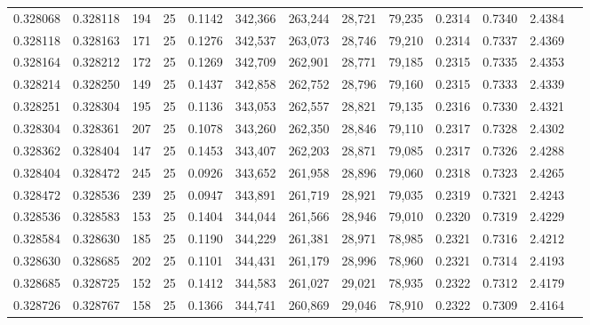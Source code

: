 \begin{tabular}{rrrrrrrrrrrrr}
0.328068 & 0.328118 &   194 &  25 &                                     0.1142 & 342,366 & 263,244 &  28,721 &  79,235 & 0.2314 & 0.7340 & 2.4384 \\
0.328118 & 0.328163 &   171 &  25 &                                     0.1276 & 342,537 & 263,073 &  28,746 &  79,210 & 0.2314 & 0.7337 & 2.4369 \\
0.328164 & 0.328212 &   172 &  25 &                                     0.1269 & 342,709 & 262,901 &  28,771 &  79,185 & 0.2315 & 0.7335 & 2.4353 \\
0.328214 & 0.328250 &   149 &  25 &                                     0.1437 & 342,858 & 262,752 &  28,796 &  79,160 & 0.2315 & 0.7333 & 2.4339 \\
0.328251 & 0.328304 &   195 &  25 &                                     0.1136 & 343,053 & 262,557 &  28,821 &  79,135 & 0.2316 & 0.7330 & 2.4321 \\
0.328304 & 0.328361 &   207 &  25 &                                     0.1078 & 343,260 & 262,350 &  28,846 &  79,110 & 0.2317 & 0.7328 & 2.4302 \\
0.328362 & 0.328404 &   147 &  25 &                                     0.1453 & 343,407 & 262,203 &  28,871 &  79,085 & 0.2317 & 0.7326 & 2.4288 \\
0.328404 & 0.328472 &   245 &  25 &                                     0.0926 & 343,652 & 261,958 &  28,896 &  79,060 & 0.2318 & 0.7323 & 2.4265 \\
0.328472 & 0.328536 &   239 &  25 &                                     0.0947 & 343,891 & 261,719 &  28,921 &  79,035 & 0.2319 & 0.7321 & 2.4243 \\
0.328536 & 0.328583 &   153 &  25 &                                     0.1404 & 344,044 & 261,566 &  28,946 &  79,010 & 0.2320 & 0.7319 & 2.4229 \\
0.328584 & 0.328630 &   185 &  25 &                                     0.1190 & 344,229 & 261,381 &  28,971 &  78,985 & 0.2321 & 0.7316 & 2.4212 \\
0.328630 & 0.328685 &   202 &  25 &                                     0.1101 & 344,431 & 261,179 &  28,996 &  78,960 & 0.2321 & 0.7314 & 2.4193 \\
0.328685 & 0.328725 &   152 &  25 &                                     0.1412 & 344,583 & 261,027 &  29,021 &  78,935 & 0.2322 & 0.7312 & 2.4179 \\
0.328726 & 0.328767 &   158 &  25 &                                     0.1366 & 344,741 & 260,869 &  29,046 &  78,910 & 0.2322 & 0.7309 & 2.4164 \\

\end{tabular}
